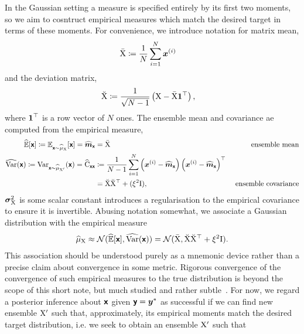 \documentclass[wcp]{jmlr} %
\begin{document}
In the Gaussian setting a measure is specified entirely by its first two moments, so we aim to cosntruct empirical measures which match the desired target in terms of these moments.
For convenience, we introduce notation for matrix mean,
\begin{align}
\bar{\mathrm{X}} &\coloneq \frac{1}{N}\sum_{i=1}^N \boldsymbol{x}^{(i)}
\end{align}
and the deviation matrix,
\begin{align}
\breve{\mathrm{X}} &\coloneq \frac{1}{\sqrt{N-1}} \left( \mathrm{X} - \bar{\mathrm{X}} \boldsymbol{1}^\top \right), \label{eq:deviation_matrix}
\end{align}
where \(\boldsymbol{1}^\top\) is a row vector of \(N\) ones.
The ensemble mean and covariance ae computed from the empirical measure,
\begin{align}
    \widehat{\Ex}[\vrv{x}]\coloneq \Ex_{\vrv{x}\sim \ELaw[\mm{X}]}[ \vrv{x}] =\widehat{\vv{m}}_{\vrv{x}}
&=\mmmean{X}\label{eq:ensemble_mean} & \text{ ensemble mean}\\
\widehat{\var}(\vrv{x}) \coloneq\var_{\vrv{x}\sim \ELaw[\mm{X}']} (\vrv{x})=\widehat{\mm{C}}_{\vrv{xx}} &\coloneq \frac{1}{N-1} \sum_{i=1}^{N} \left(\vv{x}^{(i)} - \widehat{\vv{m}}_{\vrv{x}}\right)\left(\vv{x}^{(i)} - \widehat{\vv{m}}_{\vrv{x}}\right)^\top  \\
&=\mmdev{X} \mmdev{X}^\top + (\xi^2\mm{I}),&\text{ ensemble covariance}  \label{eq:ensemble-covariance}
\end{align}
$\boldsymbol{\sigma}_{\mathrm{X}}^2$ is some scalar constant introduces a regularisation to the empirical covariance to ensure it is invertible.
Abusing notation somewhat, we associate a Gaussian distribution with the empirical measure
\begin{align}
\ELaw[\mm{X}] \approx \Normal(\widehat{\Ex}[\vrv{x}], \widehat{\var}(\vrv{x})) = \Normal(\mmmean{X}, \mmdev{X} \mmdev{X}^\top + \xi^2\mm{I}).
\end{align}
This association should be understood purely as a mnemonic device rather than a precise claim about convergence in some metric.
Rigorous convergence of the convergence of such empirical measures to the true distribution is beyond the scope of this short note, but much studied and rather subtle~\citep{LeGland2009Large,Mandel2011Convergence,Kelly2014Wellposedness,Kwiatkowski2015Convergence,DelMoral2017Stability}.
For now, we regard a posterior inference about $\boldsymbol{\mathsf{x}}$ given $\boldsymbol{\mathsf{y}}=\boldsymbol{y}^*$ as successful if we can find  new ensemble $\mathrm{X}'$ such that, approximately, its empirical moments match the desired target distribution, i.e. we seek to obtain an ensemble $\mathrm{X}'$ such that
\end{document}
